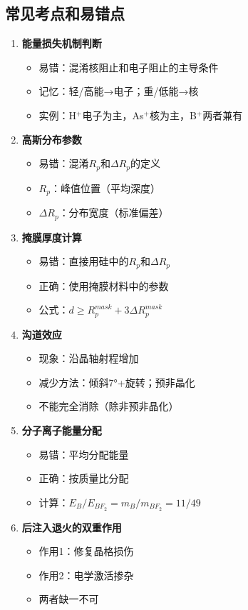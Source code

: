 \documentclass[UTF8,12pt,a4paper]{ctexart}
\begin{document}
\subsection{常见考点和易错点}

\begin{enumerate}
    \item \textbf{能量损失机制判断}
    \begin{itemize}
        \item 易错：混淆核阻止和电子阻止的主导条件
        \item 记忆：轻/高能→电子；重/低能→核
        \item 实例：H$^+$电子为主，As$^+$核为主，B$^+$两者兼有
    \end{itemize}
    
    \item \textbf{高斯分布参数}
    \begin{itemize}
        \item 易错：混淆$R_p$和$\Delta R_p$的定义
        \item $R_p$：峰值位置（平均深度）
        \item $\Delta R_p$：分布宽度（标准偏差）
    \end{itemize}
    
    \item \textbf{掩膜厚度计算}
    \begin{itemize}
        \item 易错：直接用硅中的$R_p$和$\Delta R_p$
        \item 正确：使用掩膜材料中的参数
        \item 公式：$d \geq R_p^{mask} + 3\Delta R_p^{mask}$
    \end{itemize}
    
    \item \textbf{沟道效应}
    \begin{itemize}
        \item 现象：沿晶轴射程增加
        \item 减少方法：倾斜7°+旋转；预非晶化
        \item 不能完全消除（除非预非晶化）
    \end{itemize}
    
    \item \textbf{分子离子能量分配}
    \begin{itemize}
        \item 易错：平均分配能量
        \item 正确：按质量比分配
        \item 计算：$E_B/E_{BF_2} = m_B/m_{BF_2} = 11/49$
    \end{itemize}
    
    \item \textbf{后注入退火的双重作用}
    \begin{itemize}
        \item 作用1：修复晶格损伤
        \item 作用2：电学激活掺杂
        \item 两者缺一不可
    \end{itemize}
\end{enumerate}
\end{document}
